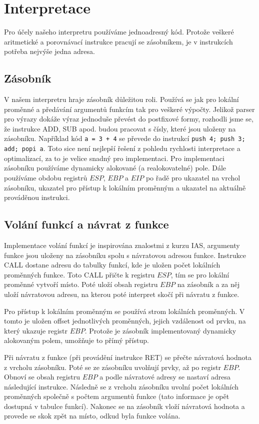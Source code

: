 \documentclass[a4paper,11pt,titlepage]{article}
\begin{document}
\section{Interpretace}

Pro účely našeho interpretru používáme jednoadresný kód. Pro\-to\-že veškeré aritmetické a porovnávací instrukce pracují se zásobníkem, je v instrukcích potřeba nejvýše jedna adresa.

\subsection{Zásobník}

V našem interpretru hraje zásobník důležitou roli. Používá se jak pro lokální proměnné a předávání argumentů funkcím tak pro veškeré výpočty. Jelikož parser pro výrazy dokáže výraz jednoduše převést do postfixové formy, rozhodli jsme se, že instrukce ADD, SUB apod. budou pracovat s čísly, které jsou uloženy na zásobníku. Například kód {\tt a = 3 + 4} se převede do instrukcí {\tt push 4; push 3; add; popi a}. Toto sice není nejlepší řešení z pohledu rychlosti interpretace a optimalizací, za to je velice snadný pro implementaci. Pro implementaci zásobníku používáme dynamicky alokované (a realokovatelné) pole. Dále používáme obdobu registrů $ESP$, $EBP$ a $EIP$ po řadě pro ukazatel na vrchol zásobníku, ukazatel pro přístup k lokálním proměnným a ukazatel na aktuálně prováděnou instrukci.

\subsection{Volání funkcí a návrat z funkce}

Implementace volání funkcí je inspirována znalostmi z kurzu IAS, argumenty funkce jsou uloženy na zásobníku spolu s návratovou adresou funkce. Instrukce CALL dostane adresu do tabulky funkcí, kde je uložen počet lokálních pro\-měn\-ných funkce. Toto CALL přičte k registru $ESP$, tím se pro lokální proměnné vytvoří místo. Poté uloží obsah registru $EBP$ na zásobník a za něj uloží návratovou adresu, na kterou poté interpret skočí při návratu z funkce.


Pro přístup k lokálním proměnným se používá strom lokálních pro\-měn\-ných. V tomto je uložen offset jednotlivých proměnných, jejich vzdálenost od prvku, na který ukazuje registr $EBP$. Protože je zásobník implementovaný dynamicky alokovaným polem, umožňuje to přímý přístup.


Při návratu z funkce (při provádění instrukce RET) se přečte návratová hodnota z vrcholu zásobníku. Poté se ze zásobníku uvolňují prvky, až po registr $EBP$. Obnoví se obsah registru $EBP$ a podle návratové adresy se nastaví adresa následující instrukce. Následně se z vrcholu zásobníku uvolní počet lokálních proměnných společně s počtem argumentů funkce (tato informace je opět dostupná v tabulce funkcí). Nakonec se na zásobník vloží návratová hodnota a provede se skok zpět na místo, odkud byla funkce volána.
\end{document}
